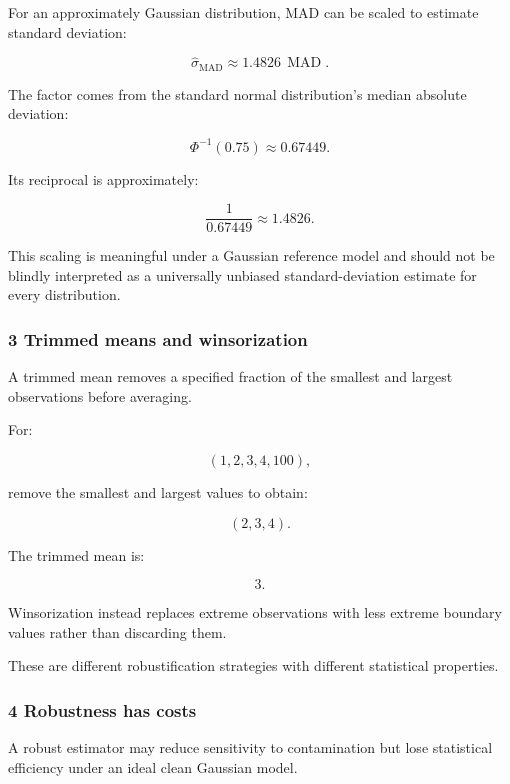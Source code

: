 \hypertarget{02-foundations-ii-ch030-gaussian-consistent-mad-scale}{}

For an approximately Gaussian distribution, MAD can be scaled to estimate standard deviation:

\[
 \boxed{ \hat\sigma_{\mathrm{MAD}} \approx1.4826\,\operatorname{MAD} }.
\]

The factor comes from the standard normal distribution's median absolute deviation:

\[
 \Phi^{-1}(0.75)\approx0.67449.
\]

Its reciprocal is approximately:

\[
 \frac1{0.67449}\approx1.4826.
\]

This scaling is meaningful under a Gaussian reference model and should not be blindly interpreted as a universally unbiased standard-deviation estimate for every distribution.

\subsubsection{3 Trimmed means and winsorization}\label{02-foundations-ii-ch030-trimmed-means-and-winsorization}

\hypertarget{02-foundations-ii-ch030-trimmed-means-and-winsorization}{}

A trimmed mean removes a specified fraction of the smallest and largest observations before averaging.

For:

\[
 (1,2,3,4,100),
\]

remove the smallest and largest values to obtain:

\[
 (2,3,4).
\]

The trimmed mean is:

\[
 \boxed{3}.
\]

Winsorization instead replaces extreme observations with less extreme boundary values rather than discarding them.

These are different robustification strategies with different statistical properties.

\subsubsection{4 Robustness has costs}\label{02-foundations-ii-ch030-robustness-has-costs}

\hypertarget{02-foundations-ii-ch030-robustness-has-costs}{}

A robust estimator may reduce sensitivity to contamination but lose statistical efficiency under an ideal clean Gaussian model.

